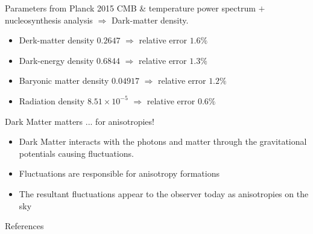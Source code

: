 \documentclass{beamer}
\begin{document}
\begin{frame}{Parameters from Planck 2015}
CMB \& temperature power spectrum  $+$ nucleosynthesis analysis $\Rightarrow$ Dark-matter density.
\vspace{0.3cm}
\begin{itemize}
    \item Derk-matter density $0.2647$ $\Rightarrow$ relative error $1.6 \%$
    \vspace{0.3cm}
    \item Dark-energy density $0.6844$ $\Rightarrow$ relative error $1.3 \%$
        \vspace{0.3cm}

    \item Baryonic matter density $0.04917$ $\Rightarrow$ relative error $1.2 \%$
        \vspace{0.3cm}

    \item Radiation density $8.51 \times 10^{-5}$ $\Rightarrow$ relative error $0.6 \%$
\end{itemize}
\end{frame}

\begin{frame}{Dark Matter matters ... for anisotropies!}
    \begin{itemize}
        \item Dark Matter interacts with the photons and matter through the gravitational potentials causing fluctuations.
        \vspace{0.5cm}
        \item Fluctuations are  responsible for anisotropy formations
        \vspace{0.5cm}
        \item The resultant fluctuations appear to the observer today as anisotropies on the sky
    \end{itemize}

\end{frame}



\begin{frame}[allowframebreaks]{References}
\nocite{*}


\end{frame}
\end{document}
